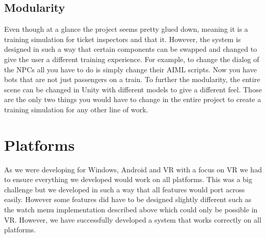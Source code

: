 \subsection{Modularity}
Even though at a glance the project seems pretty glued down, meaning it is a training simulation for ticket inspectors and that it. However, the system is designed in such a way that certain components can be swapped and changed to give the user a different training experience. For example, to change the dialog of the NPCs all you have to do is simply change their AIML scripts. Now you have bots that are not just passengers on a train. To further the modularity, the entire scene can be changed in Unity with different models to give a different feel. Those are the only two things you would have to change in the entire project to create a training simulation for any other line of work.

\section{Platforms}
As we were developing for Windows, Android and VR with a focus on VR we had to ensure everything we developed would work on all platforms. This was a big challenge but we developed in such a way that all features would port across easily. However some features did have to be designed slightly different such as the watch menu implementation described above which could only be possible in VR. However, we have successfully developed a system that works correctly on all platforms.